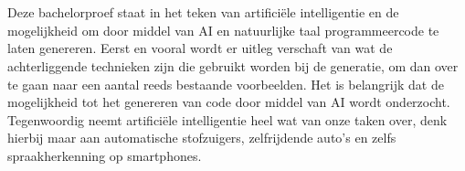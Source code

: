 
%
%

%



\chapter*{}

Deze bachelorproef staat in het teken van artificiële intelligentie en de mogelijkheid om door middel van AI en natuurlijke taal programmeercode te laten genereren. Eerst en vooral wordt er uitleg verschaft van wat de achterliggende technieken zijn die gebruikt worden bij de generatie, om dan over te gaan naar een aantal reeds bestaande voorbeelden. Het is belangrijk dat de mogelijkheid tot het genereren van code door middel van AI wordt onderzocht. Tegenwoordig neemt artificiële intelligentie heel wat van onze taken over, denk hierbij maar aan automatische stofzuigers, zelfrijdende auto's en zelfs spraakherkenning op smartphones.

